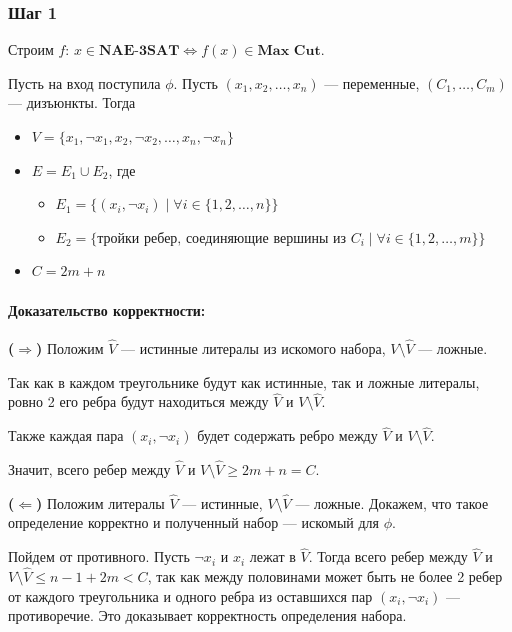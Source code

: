 \documentclass[12pt,a4paper]{article}
\begin{document}
\subsubsection*{Шаг 1}
Строим $f$: $x \in \textbf{NAE-3SAT} \Leftrightarrow f(x) \in \textbf{Max Cut}$.

Пусть на вход поступила $\phi$. Пусть $(x_1, x_2, \dots, x_n)$ --- переменные, $(C_1, \dots, C_m)$ --- дизъюнкты. Тогда
\begin{itemize}
    \item $V = \{x_1, \neg x_1, x_2, \neg x_2, \dots, x_n, \neg x_n\}$
    \item $E = E_1 \cup E_2$, где
    \begin{itemize}
        \item $E_1 = \{(x_i, \neg x_i) \mid \forall i \in \{1, 2, \dots, n\}\}$
        \item $E_2 = \{\text{тройки ребер, соединяющие вершины из } C_i \mid \forall i \in \{1, 2, \dots, m\}\}$
    \end{itemize}
    \item $C = 2m + n$
\end{itemize}

\paragraph{Доказательство корректности:}

\textbf{($\Rightarrow$)} Положим $\hat{V}$ --- истинные литералы из искомого набора, $V \setminus \hat{V}$ --- ложные.

Так как в каждом треугольнике будут как истинные, так и ложные литералы, ровно 2 его ребра будут находиться между $\hat{V}$ и $V \setminus \hat{V}$.

Также каждая пара $(x_i, \neg x_i)$ будет содержать ребро между $\hat{V}$ и $V \setminus \hat{V}$.

Значит, всего ребер между $\hat{V}$ и $V \setminus \hat{V} \ge 2m + n = C$.

\textbf{($\Leftarrow$)} Положим литералы $\hat{V}$ --- истинные, $V \setminus \hat{V}$ --- ложные. Докажем, что такое определение корректно и полученный набор --- искомый для $\phi$.

Пойдем от противного. Пусть $\neg x_i$ и $x_i$ лежат в $\hat{V}$. Тогда всего ребер между $\hat{V}$ и $V \setminus \hat{V} \le n - 1 + 2m < C$, так как между половинами может быть не более 2 ребер от каждого треугольника и одного ребра из оставшихся пар $(x_i, \neg x_i)$ --- противоречие. Это доказывает корректность определения набора.
\end{document}
